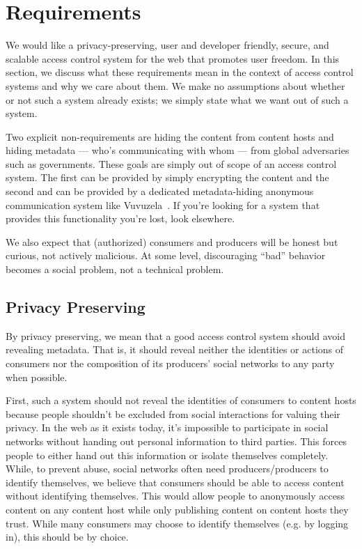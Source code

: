 \documentclass[pdftex,12pt,a4papaer,twoside,notitlepage]{report}
\begin{document}
\section{Requirements}

We would like a privacy-preserving, user and developer friendly, secure, and
scalable access control system for the web that promotes user freedom. In this
section, we discuss what these requirements mean in the context of access
control systems and why we care about them. We make no assumptions about whether
or not such a system already exists; we simply state what we want out of such a
system.

Two explicit non-requirements are hiding the content from content hosts and
hiding metadata --- who's communicating with whom --- from global adversaries
such as governments. These goals are simply out of scope of an access control
system. The first can be provided by simply encrypting the content and the
second and can be provided by a dedicated metadata-hiding anonymous
communication system like Vuvuzela~\cite{vuvuzela}. If you're looking for a
system that provides this functionality you're lost, look elsewhere.

We also expect that (authorized) consumers and producers will be honest but
curious, not actively malicious. At some level, discouraging ``bad'' behavior
becomes a social problem, not a technical problem.

\subsection{Privacy Preserving}

By privacy preserving, we mean that a good access control system should avoid
revealing metadata. That is, it should reveal neither the identities or actions
of consumers nor the composition of its producers' social networks to any party
when possible.

First, such a system should not reveal the identities of consumers to content
hosts because people shouldn't be excluded from social interactions for valuing
their privacy. In the web as it exists today, it's impossible to participate in
social networks without handing out personal information to third parties. This
forces people to either hand out this information or isolate themselves
completely. While, to prevent abuse, social networks often need
producers/producers to identify themselves, we believe that consumers should be
able to access content without identifying themselves. This would allow people
to anonymously access content on any content host while only publishing content
on content hosts they trust. While many consumers may choose to identify
themselves (e.g. by logging in), this should be by choice.
\end{document}
